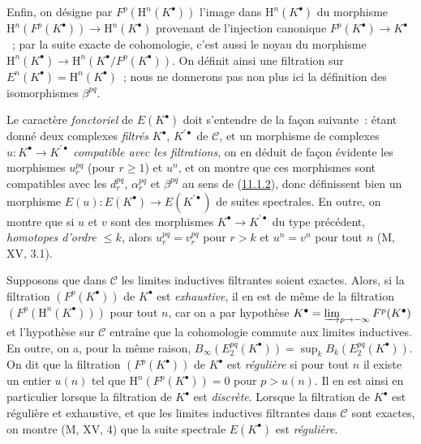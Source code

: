 \begin{env}[11.2.2]
Enfin, on désigne par $F^p(\mathrm H^n(K^\bullet))$ l'image dans
$\mathrm H^n(K^\bullet)$ du morphisme
$\mathrm H^n(F^p(K^\bullet))\to\mathrm H^n(K^\bullet)$ provenant de
l'injection canonique $F^p(K^\bullet)\to K^\bullet$~; par la suite exacte de
cohomologie, c'est aussi le noyau du morphisme
$\mathrm H^n(K^\bullet)\to\mathrm H^n(K^\bullet/F^p(K^\bullet))$. On
définit ainsi une filtration sur
$E^n(K^\bullet)=\mathrm H^n(K^\bullet)$~; nous ne donnerons pas non plus ici
la définition des isomorphismes $\beta^{pq}$.
\end{env}

\begin{env}[11.2.3]
\label{0.11.2.3-fr}
Le caractère \emph{fonctoriel} de $E(K^\bullet)$ doit s'entendre de la façon
suivante~: étant donné deux complexes \emph{filtrés} $K^\bullet$,
$K^{\prime\bullet}$ de $\mathcal C$, et un morphisme de complexes
$u:K^\bullet\to K^{\prime\bullet}$ \emph{compatible avec les filtrations}, on
en déduit de façon évidente les morphismes $u_r^{pq}$ (pour $r\geq1$) et
$u^n$, et on montre que ces morphismes sont compatibles avec les $d_r^{pq}$,
$\alpha_r^{pq}$ et $\beta^{pq}$ au sens de
(\hyperref[0.11.1.2-fr]{11.1.2}), donc définissent bien un morphisme
$E(u):E(K^\bullet)\to E(K^{\prime\bullet})$ de suites spectrales. En outre,
on montre que si $u$ et $v$ sont des morphismes
$K^\bullet\to K^{\prime\bullet}$ du type précédent, \emph{homotopes d'ordre
$\leq k$}, alors $u_r^{pq}=v_r^{pq}$ pour $r>k$ et $u^n=v^n$ pour tout $n$
(M, XV, 3.1).
\end{env}

\begin{env}[11.2.4]
\label{0.11.2.4-fr}
Supposons que dans $\mathcal C$ les limites inductives filtrantes soient
exactes. Alors, si la filtration $(F^p(K^\bullet))$ de $K^\bullet$ est
\emph{exhaustive}, il en est de même de la filtration
$(F^p(\mathrm H^n(K^\bullet)))$ pour tout $n$, car on a par hypothèse
$K^\bullet=\varinjlim_{p\to-\infty}F^p(K^\bullet)$ et l'hypothèse sur
$\mathcal C$ entraîne que la cohomologie commute aux limites inductives. En
outre, on a, pour la même raison,
$B_\infty(E_2^{pq}(K^\bullet))=\sup_k B_k(E_2^{pq}(K^\bullet))$. On dit que
la filtration $(F^p(K^\bullet))$ de $K^\bullet$ est \emph{régulière} si pour
tout $n$ il existe un entier $u(n)$ tel que
$\mathrm H^n(F^p(K^\bullet))=0$ pour $p>u(n)$. Il en est ainsi en particulier
lorsque la filtration de $K^\bullet$ est \emph{discrète}. Lorsque la
filtration de $K^\bullet$ est régulière et exhaustive, et que les limites
inductives filtrantes dans $\mathcal C$ sont exactes, on montre (M, XV, 4)
que la suite spectrale $E(K^\bullet)$ est \emph{régulière}.
\end{env}

